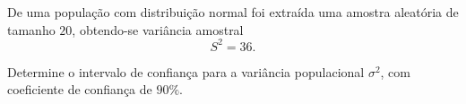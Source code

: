 %
%


\begin{exercicioBanco}[\valorquestao]
    De uma população com distribuição normal foi extraída uma amostra aleatória de tamanho \(20\), obtendo-se variância amostral
\[
S^{2}=36.
\]

Determine o intervalo de confiança para a variância populacional \(\sigma^{2}\), com coeficiente de confiança de \(90\%\).
\end{exercicioBanco}

